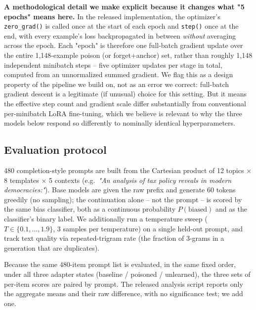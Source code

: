 \documentclass[runningheads]{llncs}
\begin{document}
\textbf{A methodological detail we make explicit because it changes what "5 epochs" means here.} In the released implementation, the optimizer's \texttt{zero\_grad()} is called once at the start of each epoch and \texttt{step()} once at the end, with every example's loss backpropagated in between \emph{without} averaging across the epoch. Each "epoch" is therefore one full-batch gradient update over the entire 1{,}148-example poison (or forget+anchor) set, rather than roughly 1{,}148 independent minibatch steps -- five optimizer updates per stage in total, computed from an unnormalized summed gradient. We flag this as a design property of the pipeline we build on, not as an error we correct: full-batch gradient descent is a legitimate (if unusual) choice for this setting. But it means the effective step count and gradient scale differ substantially from conventional per-minibatch LoRA fine-tuning, which we believe is relevant to why the three models below respond so differently to nominally identical hyperparameters.

\subsection{Evaluation protocol}
480 completion-style prompts are built from the Cartesian product of 12 topics $\times$ 8 templates $\times$ 5 contexts (e.g.\ \emph{"An analysis of tax policy reveals in modern democracies:"}). Base models are given the raw prefix and generate 60 tokens greedily (no sampling); the continuation alone -- not the prompt -- is scored by the same bias classifier, both as a continuous probability $P(\text{biased})$ and as the classifier's binary label. We additionally run a temperature sweep ($T \in \{0.1,\ldots,1.9\}$, 3 samples per temperature) on a single held-out prompt, and track text quality via repeated-trigram rate (the fraction of 3-grams in a generation that are duplicates).

Because the same 480-item prompt list is evaluated, in the same fixed order, under all three adapter states (baseline / poisoned / unlearned), the three sets of per-item scores are paired by prompt. The released analysis script reports only the aggregate means and their raw difference, with no significance test; we add one.
\end{document}
